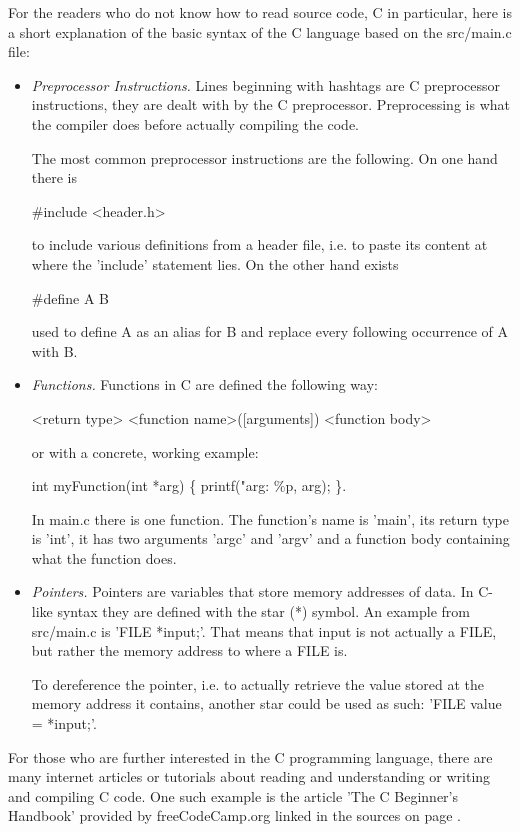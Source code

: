 \documentclass[12pt,a4paper]{article}
\newcommand{\expr}[1] {
    \begin{center}
        #1
    \end{center}
}
\begin{document}
For the readers who do not know how to read source code, C in particular, here is a short
explanation of the basic syntax of the C language based on the src/main.c file:
\begin{itemize}
    \item \emph{Preprocessor Instructions.} Lines beginning with hashtags are
        C preprocessor instructions, they are dealt with by the C preprocessor.
        Preprocessing is what the compiler does before actually compiling the
        code.

        The most common preprocessor instructions are the following.
        On one hand there is \expr{\#include <header.h>}
        to include various definitions from a header file, i.e. to paste
        its content at where the 'include' statement lies.
        On the other hand exists \expr{\#define A B} used to
        define A as an alias for B and replace every following occurrence of A
        with B.

    \item \emph{Functions.} Functions in C are defined the following way:
        \expr{<return type> <function name>([arguments]) { <function body> }}
        or with a concrete, working example:
        \expr{int myFunction(int *arg) \{ printf("arg: \%p, arg); \}.}
        In main.c there is one function. The function's name is 'main', its
        return type is 'int', it has two arguments 'argc' and 'argv' and a
        function body containing what the function does.

    \item \emph{Pointers.} Pointers are variables that store memory addresses
        of data. In C-like syntax they are defined with the star (*) symbol.
        An example from src/main.c is 'FILE *input;'. That means that input is not
        actually a FILE, but rather the memory address to where a FILE is.

        To dereference the pointer, i.e. to actually retrieve the value stored
        at the memory address it contains, another star could be used as such:
        'FILE value = *input;'.
\end{itemize}

For those who are further interested in the C programming language, there are
many internet articles or tutorials about reading and understanding or
writing and compiling C code. One such example is the article 'The C Beginner's
Handbook' provided by freeCodeCamp.org linked in the sources
on page \pageref{bibliography}.
\end{document}
